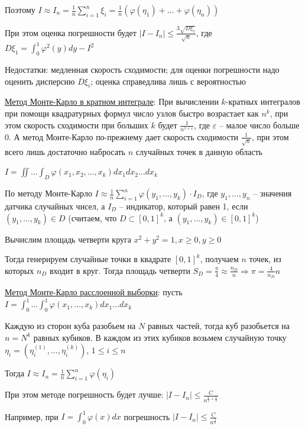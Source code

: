 \begin{enumerate}
    Поэтому $I \approx I_n = \frac{1}{n} \sum_{i = 1}^n \xi_i = \frac{1}{n} (\varphi(\eta_1) + \dots + \varphi(\eta_n))$

    При этом оценка погрешности будет $|I - I_n| \leq \frac{3\sqrt{D \xi_1}}{\sqrt{n}}$, где $D \xi_1 = \int_0^1 \varphi^2(y) dy - I^2$

    Недостатки: медленная скорость сходимости; для оценки погрешности надо оценить дисперсию $D\xi_i$; оценка справедлива лишь с вероятностью

    
    \hyperlink{monte_carlo_k_integral}{Метод Монте-Карло в кратном интеграле}: При вычислении $k$-кратных интегралов при помощи квадратурных формул число узлов быстро возрастает как $n^k$, при этом скорость сходимости при больших $k$ будет $\frac{1}{n^{1 + \varepsilon}}$, где $\varepsilon$ -- малое число больше 0. А метод Монте-Карло по-прежнему дает скорость сходимости $\frac{1}{\sqrt{n}}$, при этом всего лишь достаточно набросать $n$ случайных точек в данную область

    $I = \iint \dots \int_D \varphi(x_1, x_2, \dots, x_k) dx_1 dx_2 \dots dx_k$

    По методу Монте-Карло $I \approx \frac{1}{n} \sum_{i = 1}^n \varphi(y_1, \dots, y_k) \cdot I_D$, где $y_1, \dots, y_n$ -- значения датчика случайных чисел, а $I_D$ -- индикатор, который равен 1, если $(y_1, \dots, y_k) \in D$ (считаем, что $D \subset [0, 1]^k$, а $(y_1, \dots, y_k) \in [0, 1]^k$) 

    \Ex Вычислим площадь четверти круга $x^2 + y^2 = 1, x \geq 0, y \geq 0$

    Тогда генерируем случайные точки в квадрате $[0, 1]^k$, получаем $n$ точек, из которых $n_D$ входит в круг. Тогда площадь четверти $S_D = \frac{\pi}{4} \approx \frac{n_D}{n} \Longrightarrow \pi = \frac{4}{n_D}{n}$

    
    \hyperlink{monte_carlo_2}{Метод Монте-Карло расслоенной выборки}: пусть $I = \int_0^1 \dots \int_0^1 \varphi(x_1, \dots, x_k) dx_1 \dots dx_k$

    Каждую из сторон куба разобьем на $N$ равных частей, тогда куб разобьется на $n = N^k$ равных кубиков. В каждом из этих кубиков возьмем случайную точку $\eta_i = (\eta_i^{(1)}, \dots, \eta_i^{(k)})$, $1 \leq i \leq n$

    Тогда $I \approx I_n = \frac{1}{n} \sum_{i = 1}^n \varphi(\eta_i)$

    При этом методе погрешность будет лучше: $|I - I_n| \leq \frac{C}{n^{\frac{1}{2} + \frac{1}{k}}}$

    Например, при $I = \int_0^1 \varphi(x) dx$ погрешность $|I - I_n| \leq \frac{C}{n^\frac{3}{2}}$


\end{enumerate}
